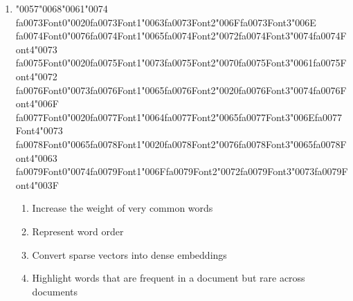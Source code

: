 \documentclass[12pt]{article}
\begin{document}
\begin{enumerate}[label=Q\arabic*.]
\item {\char"0057}{\char"0068}{\char"0061}{\char"0074} {\csname fa0073Font0\endcsname\char"0020}{\csname fa0073Font1\endcsname\char"0063}{\csname fa0073Font2\endcsname\char"006F}{\csname fa0073Font3\endcsname\char"006E} {\csname fa0074Font0\endcsname\char"0076}{\csname fa0074Font1\endcsname\char"0065}{\csname fa0074Font2\endcsname\char"0072}{\csname fa0074Font3\endcsname\char"0074}{\csname fa0074Font4\endcsname\char"0073} {\csname fa0075Font0\endcsname\char"0020}{\csname fa0075Font1\endcsname\char"0073}{\csname fa0075Font2\endcsname\char"0070}{\csname fa0075Font3\endcsname\char"0061}{\csname fa0075Font4\endcsname\char"0072} {\csname fa0076Font0\endcsname\char"0073}{\csname fa0076Font1\endcsname\char"0065}{\csname fa0076Font2\endcsname\char"0020}{\csname fa0076Font3\endcsname\char"0074}{\csname fa0076Font4\endcsname\char"006F} {\csname fa0077Font0\endcsname\char"0020}{\csname fa0077Font1\endcsname\char"0064}{\csname fa0077Font2\endcsname\char"0065}{\csname fa0077Font3\endcsname\char"006E}{\csname fa0077Font4\endcsname\char"0073} {\csname fa0078Font0\endcsname\char"0065}{\csname fa0078Font1\endcsname\char"0020}{\csname fa0078Font2\endcsname\char"0076}{\csname fa0078Font3\endcsname\char"0065}{\csname fa0078Font4\endcsname\char"0063} {\csname fa0079Font0\endcsname\char"0074}{\csname fa0079Font1\endcsname\char"006F}{\csname fa0079Font2\endcsname\char"0072}{\csname fa0079Font3\endcsname\char"0073}{\csname fa0079Font4\endcsname\char"003F}
\begin{enumerate}[label=(\Alph*)]
    \item Increase the weight of very common words
    \item Represent word order
    \item Convert sparse vectors into dense embeddings
    \item Highlight words that are frequent in a document but rare across documents
\end{enumerate}

\end{enumerate}
\end{document}
